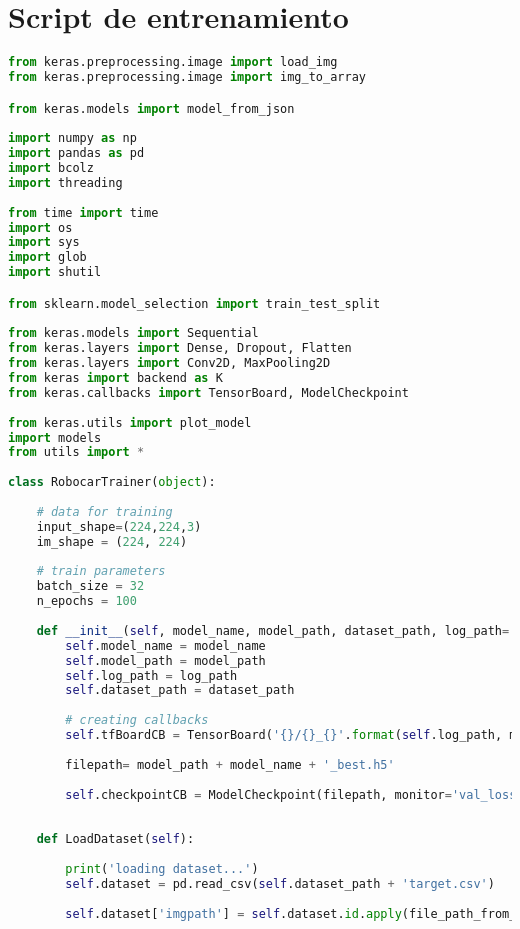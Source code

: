 \section{Script de entrenamiento}
\begin{lstlisting}[title={train\_model.py},language=Python]
from keras.preprocessing.image import load_img
from keras.preprocessing.image import img_to_array

from keras.models import model_from_json
    
import numpy as np
import pandas as pd
import bcolz
import threading
    
from time import time
import os
import sys
import glob
import shutil

from sklearn.model_selection import train_test_split
    
from keras.models import Sequential
from keras.layers import Dense, Dropout, Flatten
from keras.layers import Conv2D, MaxPooling2D
from keras import backend as K
from keras.callbacks import TensorBoard, ModelCheckpoint
    
from keras.utils import plot_model
import models
from utils import *
    
class RobocarTrainer(object):
        
    # data for training
    input_shape=(224,224,3)
    im_shape = (224, 224)
    
    # train parameters
    batch_size = 32
    n_epochs = 100
    
    def __init__(self, model_name, model_path, dataset_path, log_path='trainlogs'):
        self.model_name = model_name
        self.model_path = model_path
        self.log_path = log_path
        self.dataset_path = dataset_path
            
        # creating callbacks
        self.tfBoardCB = TensorBoard('{}/{}_{}'.format(self.log_path, model_name, time()), write_graph=True)
    
        filepath= model_path + model_name + '_best.h5'
    
        self.checkpointCB = ModelCheckpoint(filepath, monitor='val_loss', verbose=1, save_best_only=True, mode='min')
    
        
    def LoadDataset(self):
    
        print('loading dataset...')
        self.dataset = pd.read_csv(self.dataset_path + 'target.csv')
    
        self.dataset['imgpath'] = self.dataset.id.apply(file_path_from_db_id, args=("%d.bmp", self.dataset_path))
    

\end{lstlisting}
